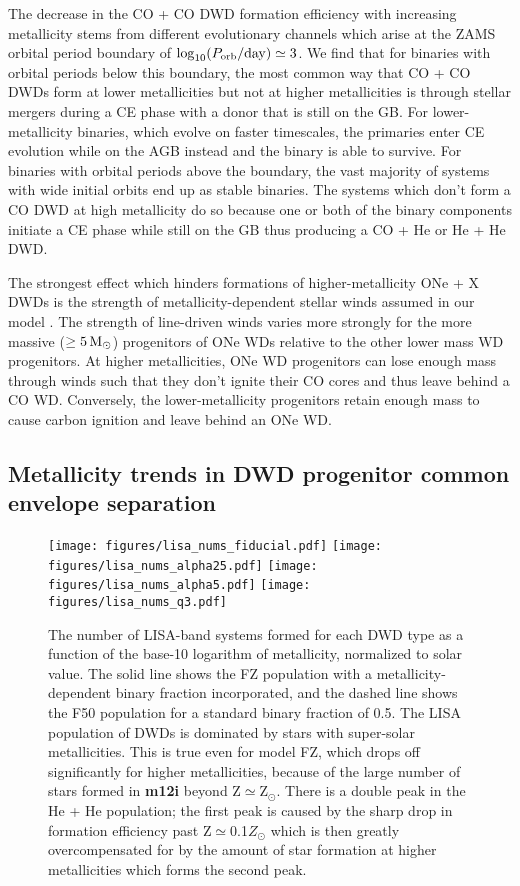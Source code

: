 \documentclass[twocolumn, linenumbers]{aastex631}
\begin{document}
The decrease in the CO + CO DWD formation efficiency with increasing metallicity stems from different evolutionary channels which arise at the ZAMS orbital period boundary of $\log_{10}(P_{\rm{orb}}/\rm{day})\simeq3$. We find that for binaries with orbital periods below this boundary, the most common way that CO + CO DWDs form at lower metallicities but not at higher metallicities is through stellar mergers during a CE phase with a donor that is still on the GB. For lower-metallicity binaries, which evolve on faster timescales, the primaries enter CE evolution while on the AGB instead and the binary is able to survive. For binaries with orbital periods above the boundary, the vast majority of systems with wide initial orbits end up as stable binaries. The systems which don’t form a CO DWD at high metallicity do so because one or both of the binary components initiate a CE phase while still on the GB thus producing a CO + He or He + He DWD. 

The strongest effect which hinders formations of higher-metallicity ONe + X DWDs is the strength of metallicity-dependent stellar winds assumed in our model \citep{Vink2001}. The strength of line-driven winds varies more strongly for the more massive ($\geq5\,\rm{M}_\odot$) progenitors of ONe WDs relative to the other lower mass WD progenitors. At higher metallicities, ONe WD progenitors can lose enough mass through winds such that they don't ignite their CO cores and thus leave behind a CO WD. Conversely, the lower-metallicity progenitors retain enough mass to cause carbon ignition and leave behind an ONe WD.

\subsection{Metallicity trends in DWD progenitor common envelope separation}\label{sec:CEsep}

\begin{figure*}
	\texttt{[image: figures/lisa\_nums\_fiducial.pdf]}
	\texttt{[image: figures/lisa\_nums\_alpha25.pdf]}
	\texttt{[image: figures/lisa\_nums\_alpha5.pdf]}
	\texttt{[image: figures/lisa\_nums\_q3.pdf]}
    \caption{The number of LISA-band systems formed for each DWD type as a function of the base-10 logarithm of metallicity, normalized to solar value. The solid line shows the FZ population with a metallicity-dependent binary fraction incorporated, and the dashed line shows the F50 population for a standard binary fraction of 0.5. The LISA population of DWDs is dominated by stars with super-solar metallicities. This is true even for model FZ, which drops off significantly for higher metallicities, because of the large number of stars formed in \textbf{m12i} beyond Z$\simeq$Z$_\odot$. There is a double peak in the He + He population; the first peak is caused by the sharp drop in formation efficiency past Z$\simeq$0.1$Z_\odot$ which is then greatly overcompensated for by the amount of star formation at higher metallicities which forms the second peak.}
    \label{fig:lisa_nums}
\end{figure*}
\end{document}
